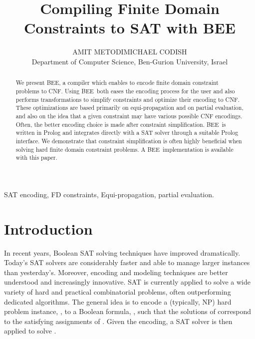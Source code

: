 \documentclass{tlp}
\newcommand{\bee}{\textsf{BEE}}
\begin{document}
\title[Compiling Finite Domain Constraints]{ Compiling Finite Domain
  \\Constraints to SAT with \bee }

\author[A.~Metodi and M.~Codish]{AMIT METODI\qquad MICHAEL CODISH\\
Department of Computer Science, Ben-Gurion University, Israel
}



\maketitle
\label{firstpage}


\begin{abstract}
  We present \bee, a compiler which enables to encode finite domain
  constraint problems to CNF. Using \bee\ both eases the encoding
  process for the user and also performs transformations to simplify
  constraints and optimize their encoding to CNF. These optimizations
  are based primarily on equi-propagation and on partial evaluation,
  and also on the idea that a given constraint may have various
  possible CNF encodings. Often, the better encoding choice is made
  after constraint simplification. \bee\ is written in Prolog and
  integrates directly with a SAT solver through a suitable Prolog
  interface. We demonstrate that constraint simplification is often
  highly beneficial when solving hard finite domain constraint
  problems. A  \bee\ implementation is available with this
  paper. 
\end{abstract}






\begin{keywords}
 SAT encoding,
 FD constraints, Equi-propagation, partial evaluation.
\end{keywords}

\section{Introduction}

In recent years, Boolean SAT solving techniques have improved
dramatically. Today's SAT solvers are considerably faster and able to
manage larger instances than yesterday's. Moreover, encoding and
modeling techniques are better understood and increasingly
innovative. SAT is currently applied to solve a wide variety of hard
and practical combinatorial problems, often outperforming
dedicated algorithms.
The general idea is to encode a (typically, NP) hard problem instance,
, to a Boolean formula, , such that the solutions of
 correspond to the satisfying assignments of . Given
the encoding, a SAT solver is then applied to solve .
\end{document}
